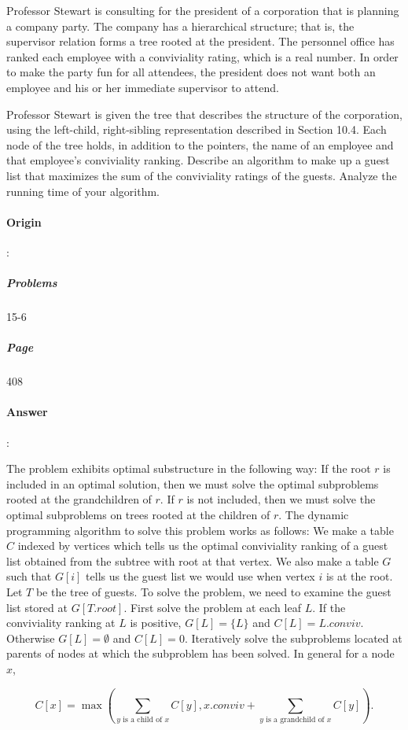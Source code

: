 \documentclass{article}
\begin{document}
Professor Stewart is consulting for the president of a corporation that is planning a company party. The company has a hierarchical structure; that is, the supervisor relation forms a tree rooted at the president. The personnel office has ranked each employee with a conviviality rating, which is a real number. In order to make the party fun for all attendees, the president does not want both an employee and his or her immediate supervisor to attend.

Professor Stewart is given the tree that describes the structure of the corporation, using the left-child, right-sibling representation described in Section 10.4. Each node of the tree holds, in addition to the pointers, the name of an employee and that employee's conviviality ranking. Describe an algorithm to make up a guest list that maximizes the sum of the conviviality ratings of the guests. Analyze the running time of your algorithm.

\paragraph{Origin}:
  \subparagraph{Problems}15-6
  \subparagraph{Page}408
\paragraph{Answer}:

The problem exhibits optimal substructure in the following way: If the root $r$ is included in an optimal solution, then we must solve the optimal subproblems rooted at the grandchildren of $r$. If $r$ is not included, then we must solve the optimal subproblems on trees rooted at the children of $r$. The dynamic programming algorithm to solve this problem works as follows: We make a table $C$ indexed by vertices which tells us the optimal conviviality ranking of a guest list obtained from the subtree with root at that vertex. We also make a table $G$ such that $G[i]$ tells us the guest list we would use when vertex $i$ is at the root. Let $T$ be the tree of guests. To solve the problem, we need to examine the guest list stored at $G[T.root]$. First solve the problem at each leaf $L$. If the conviviality ranking at $L$ is positive, $G[L] = \{L\}$ and $C[L] = L.conviv$. Otherwise $G[L] = \emptyset$ and $C[L] = 0$. Iteratively solve the subproblems located at parents of nodes at which the subproblem has been solved. In general for a node $x$,

$$C[x] = \max(\sum_{y\text{ is a child of } x} C[y], x.conviv + \sum_{y\text{ is a grandchild of } x} C[y]).$$
\end{document}
